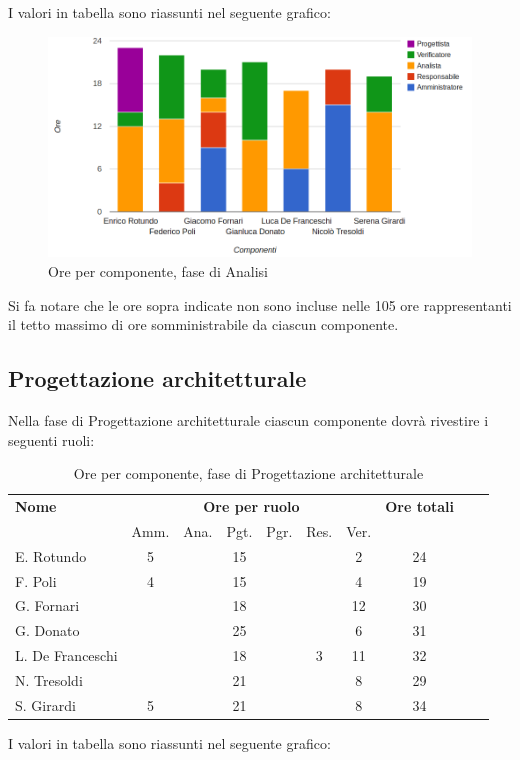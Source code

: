 I valori in tabella sono riassunti nel seguente grafico: \\ 

\begin{figure}[H]
\centering
\includegraphics[scale=0.35]{4-1.png}
\caption{Ore per componente, fase di Analisi\label{fig:nome}}
\end{figure}

Si fa notare che le ore sopra indicate non sono incluse nelle 105 ore rappresentanti il tetto massimo di ore somministrabile da ciascun componente.

\pagebreak
\subsection{Progettazione architetturale}

Nella fase di Progettazione architetturale ciascun componente dovrà rivestire i seguenti ruoli:

\begin{table}[H]
\centering
\begin{tabular}{lccccccccc}
\toprule 
    \textbf{Nome}  & \multicolumn{6}{c}{\textbf{Ore per ruolo}} & \textbf{Ore totali} \\
     & Amm. & Ana. & Pgt. & Pgr. & Res. & Ver. \\
    \midrule
    E. Rotundo   	& 5 &  &	 15	& &   &	2 &	24 \\
    F. Poli  		& 4	&  &	 15	& &   & 4 & 19 \\
    G. Fornari		& 	&  &	 18	& &   &	12 & 30 \\
    G. Donato 		& 	&  &	 25	& &   &	6 & 31 \\
    L. De Franceschi 	& 	&  &	 18	& & 3 &	11 & 32 \\
    N. Tresoldi 		& 	&  &	 21	& &   & 8 & 29 \\
   	S. Girardi 		& 5	&  &	 21	& &   &	8 & 34 \\
    
    \bottomrule
\end{tabular}
\caption{Ore per componente, fase di Progettazione architetturale}
\end{table}
I valori in tabella sono riassunti nel seguente grafico: \\ \\ \\

